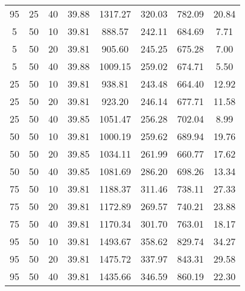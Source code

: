 \begin{table}[h]
\begin{tabular}{ccc|c|c|c|c|c}
95 & 25 & 40 & \cellcolor{gray!50}39.88 & \cellcolor{gray!1}1317.27 & \cellcolor{gray!1}320.03 & \cellcolor{gray!13}782.09 & 20.84\\
5 & 50 & 10 & \cellcolor{gray!50}39.81 & \cellcolor{gray!23}888.57 & \cellcolor{gray!1}242.11 & \cellcolor{gray!43}684.69 & 7.71\\
5 & 50 & 20 & \cellcolor{gray!50}39.81 & \cellcolor{gray!21}905.60 & \cellcolor{gray!1}245.25 & \cellcolor{gray!46}675.28 & 7.00\\
5 & 50 & 40 & \cellcolor{gray!50}39.88 & \cellcolor{gray!3}1009.15 & \cellcolor{gray!1}259.02 & \cellcolor{gray!46}674.71 & 5.50\\
25 & 50 & 10 & \cellcolor{gray!50}39.81 & \cellcolor{gray!15}938.81 & \cellcolor{gray!1}243.48 & \cellcolor{gray!49}664.40 & 12.92\\
25 & 50 & 20 & \cellcolor{gray!50}39.81 & \cellcolor{gray!18}923.20 & \cellcolor{gray!1}246.14 & \cellcolor{gray!45}677.71 & 11.58\\
25 & 50 & 40 & \cellcolor{gray!50}39.85 & \cellcolor{gray!1}1051.47 & \cellcolor{gray!1}256.28 & \cellcolor{gray!38}702.04 & 8.99\\
50 & 50 & 10 & \cellcolor{gray!50}39.81 & \cellcolor{gray!5}1000.19 & \cellcolor{gray!1}259.62 & \cellcolor{gray!41}689.94 & 19.76\\
50 & 50 & 20 & \cellcolor{gray!50}39.85 & \cellcolor{gray!1}1034.11 & \cellcolor{gray!1}261.99 & \cellcolor{gray!50}660.77 & 17.62\\
50 & 50 & 40 & \cellcolor{gray!50}39.85 & \cellcolor{gray!1}1081.69 & \cellcolor{gray!1}286.20 & \cellcolor{gray!39}698.26 & 13.34\\
75 & 50 & 10 & \cellcolor{gray!50}39.81 & \cellcolor{gray!1}1188.37 & \cellcolor{gray!1}311.46 & \cellcolor{gray!26}738.11 & 27.33\\
75 & 50 & 20 & \cellcolor{gray!50}39.81 & \cellcolor{gray!1}1172.89 & \cellcolor{gray!1}269.57 & \cellcolor{gray!26}740.21 & 23.88\\
75 & 50 & 40 & \cellcolor{gray!50}39.81 & \cellcolor{gray!1}1170.34 & \cellcolor{gray!1}301.70 & \cellcolor{gray!19}763.01 & 18.17\\
95 & 50 & 10 & \cellcolor{gray!50}39.81 & \cellcolor{gray!1}1493.67 & \cellcolor{gray!1}358.62 & \cellcolor{gray!1}829.74 & 34.27\\
95 & 50 & 20 & \cellcolor{gray!50}39.81 & \cellcolor{gray!1}1475.72 & \cellcolor{gray!1}337.97 & \cellcolor{gray!1}843.31 & 29.58\\
95 & 50 & 40 & \cellcolor{gray!50}39.81 & \cellcolor{gray!1}1435.66 & \cellcolor{gray!1}346.59 & \cellcolor{gray!1}860.19 & 22.30\\

\end{tabular}
\end{table}
